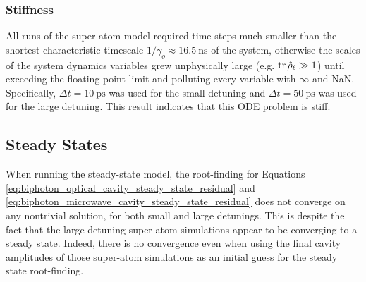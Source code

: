 \subsubsection{Stiffness}
All runs of the super-atom model required time steps much smaller than the shortest characteristic timescale $1/\gamma_o \approx \qty{16.5}{\nano\second}$ of the system, otherwise the scales of the system dynamics variables grew unphysically large (e.g. $\operatorname{tr}\hat{\rho}_\ell \gg 1$) until exceeding the floating point limit and polluting every variable with $\infty$ and NaN. Specifically, $\Delta t = \qty{10}{\pico\second}$ was used for the small detuning and $\Delta t = \qty{50}{\pico\second}$ was used for the large detuning. This result indicates that this ODE problem is stiff.

\subsection{Steady States}
When running the steady-state model, the root-finding for Equations \ref{eq:biphoton_optical_cavity_steady_state_residual} and \ref{eq:biphoton_microwave_cavity_steady_state_residual} does not converge on any nontrivial solution, for both small and large detunings. This is despite the fact that the large-detuning super-atom simulations appear to be converging to a steady state. Indeed, there is no convergence even when using the final cavity amplitudes of those super-atom simulations as an initial guess for the steady state root-finding.

